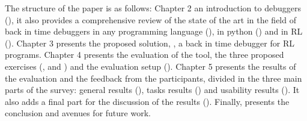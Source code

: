 The structure of the paper is as follows: Chapter 2 an introduction to debuggers (),
it also provides a comprehensive review of the state of the art in the field of back in 
time debuggers in any programming language (), in python ()
and in \ac{RL} (). Chapter 3 presents the proposed solution, \flik, 
a back in time debugger for \ac{RL} programs. Chapter 4 presents the evaluation of the tool,
the three proposed exercises (,  and 
) and the evaluation setup (). Chapter 5 presents the 
results of the evaluation and the feedback from the participants, divided in the 
three main parts of the survey: general results (), tasks 
results () and usability results (). It also adds 
a final part for the discussion of the results (). 
Finally,  presents the conclusion 
and avenues for future work.


\endinput

